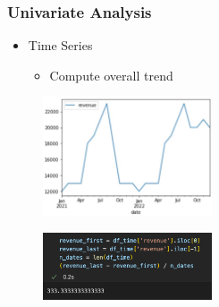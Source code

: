 \begin{frame}\frametitle{Univariate Analysis}
   \begin{minipage}{0.58\linewidth}
      \begin{itemize}
         \item Time Series
         \begin{itemize}
            \item Compute overall trend
         \end{itemize}
      \end{itemize}
      \vspace{.5cm}
      \begin{figure}[H]
         \includegraphics[width=5cm]{../images/illustrations/pattern_graph_time_series.jpg}
      \end{figure}
   \end{minipage}
   \begin{minipage}{0.38\linewidth}
      \begin{figure}[H]
         \includegraphics[width=5cm]{../images/illustrations/pattern_compute_trend_overall.png}
      \end{figure}
   \end{minipage}
\end{frame}


